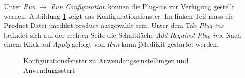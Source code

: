 Unter \textit{Run} $\rightarrow$ \textit{Run Configuration} können die Plug-ins zur Verfügung gestellt werden. Abbildung \ref{addplugins} zeigt das Konfigurationsfenster. Im linken Teil muss die Product-Datei jmedikit.product ausgewählt sein. Unter dem Tab \textit{Plug-ins} befindet sich auf der rechten Seite die Schaltfläche \textit{Add Required Plug-ins}. Nach einem Klick auf \textit{Apply} gefolgt von \textit{Run} kann jMediKit gestartet werden.

\begin{figure}[H]
  \vspace{0.5cm}
  \centering
  \caption{Konfigurationsfenster zu Anwendungseinstellungen und Anwendungsstart}
  \label{addplugins}
  \vspace{0.5cm}
\end{figure}


